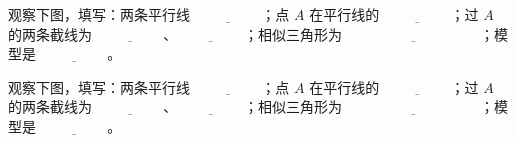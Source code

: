 \documentclass{exam-zh}
\begin{document}

\begin{problem}[points=10]
  \noindent
  \begin{minipage}[t]{\dimexpr\linewidth-60mm-6mm\relax}
    \vspace{0pt}
    观察下图，填写：两条平行线 $\underline{\hspace{2cm}}$；点 $A$ 在平行线的 $\underline{\hspace{2cm}}$；过 $A$ 的两条截线为 $\underline{\hspace{2cm}}$、$\underline{\hspace{2cm}}$；相似三角形为 $\underline{\hspace{4cm}}$；模型是 $\underline{\hspace{2cm}}$。


  \end{minipage}\hfill
  \begin{diagramcoltikz}{60mm}{第 3 题图}
  }
  \end{diagramcoltikz}
  \par\medskip
  \answerarea[38mm]
\end{problem}



\begin{problem}[points=10]
  \noindent
  \begin{minipage}[t]{\dimexpr\linewidth-60mm-6mm\relax}
    \vspace{0pt}
    观察下图，填写：两条平行线 $\underline{\hspace{2cm}}$；点 $A$ 在平行线的 $\underline{\hspace{2cm}}$；过 $A$ 的两条截线为 $\underline{\hspace{2cm}}$、$\underline{\hspace{2cm}}$；相似三角形为 $\underline{\hspace{4cm}}$；模型是 $\underline{\hspace{2cm}}$。


  \end{minipage}\hfill
  \begin{diagramcoltikz}{60mm}{第 4 题图}
  }
  \end{diagramcoltikz}
  \par\medskip
  \answerarea[38mm]
\end{problem}
\end{document}
